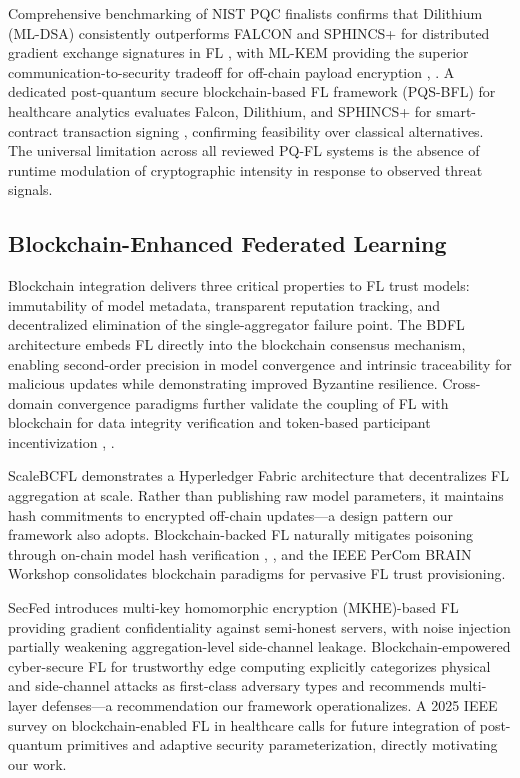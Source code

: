 \documentclass[journal, 10pt, twocolumn]{IEEEtran}
\begin{document}
Comprehensive benchmarking of NIST PQC finalists confirms that Dilithium (ML-DSA) consistently outperforms FALCON and SPHINCS+ for distributed gradient exchange signatures in FL \cite{comp_1}, with ML-KEM providing the superior communication-to-security tradeoff for off-chain payload encryption \cite{comp_2}, \cite{comp_3}. A dedicated post-quantum secure blockchain-based FL framework (PQS-BFL) for healthcare analytics evaluates Falcon, Dilithium, and SPHINCS+ for smart-contract transaction signing \cite{pqsbfl}, confirming feasibility over classical alternatives. The universal limitation across all reviewed PQ-FL systems is the absence of runtime modulation of cryptographic intensity in response to observed threat signals.

\subsection{Blockchain-Enhanced Federated Learning}
Blockchain integration delivers three critical properties to FL trust models: immutability of model metadata, transparent reputation tracking, and decentralized elimination of the single-aggregator failure point. The BDFL architecture \cite{bdfll23} embeds FL directly into the blockchain consensus mechanism, enabling second-order precision in model convergence and intrinsic traceability for malicious updates while demonstrating improved Byzantine resilience. Cross-domain convergence paradigms further validate the coupling of FL with blockchain for data integrity verification and token-based participant incentivization \cite{ictacs23}, \cite{compsac23}.

ScaleBCFL \cite{scalebcfl} demonstrates a Hyperledger Fabric architecture that decentralizes FL aggregation at scale. Rather than publishing raw model parameters, it maintains hash commitments to encrypted off-chain updates---a design pattern our framework also adopts. Blockchain-backed FL naturally mitigates poisoning through on-chain model hash verification \cite{bcfl_survey}, \cite{icpcsn24}, and the IEEE PerCom BRAIN Workshop \cite{braint} consolidates blockchain paradigms for pervasive FL trust provisioning.

SecFed \cite{secfed} introduces multi-key homomorphic encryption (MKHE)-based FL providing gradient confidentiality against semi-honest servers, with noise injection partially weakening aggregation-level side-channel leakage. Blockchain-empowered cyber-secure FL for trustworthy edge computing \cite{bc_edge} explicitly categorizes physical and side-channel attacks as first-class adversary types and recommends multi-layer defenses---a recommendation our framework operationalizes. A 2025 IEEE survey on blockchain-enabled FL in healthcare \cite{bc_healthcare_survey} calls for future integration of post-quantum primitives and adaptive security parameterization, directly motivating our work.
\end{document}
